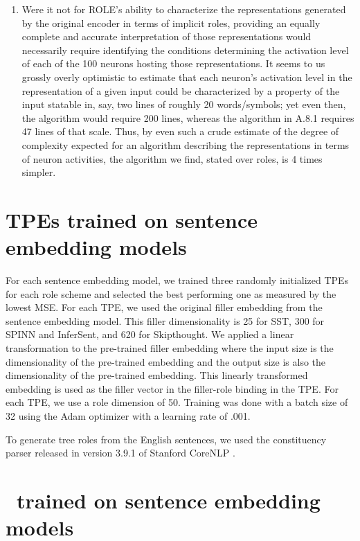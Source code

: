 \begin{enumerate}
\item
Were it not for ROLE’s ability to characterize the representations generated by the original encoder in terms of implicit roles, providing an equally complete and accurate interpretation of those representations would necessarily require identifying the conditions determining the activation level of each of the 100 neurons hosting those representations. It seems to us grossly overly optimistic to estimate that each neuron’s activation level in the representation of a given input could be characterized by a property of the input statable in, say, two lines of roughly 20 words/symbols; yet even then, the algorithm would require 200 lines, whereas the algorithm in A.8.1 requires 47 lines of that scale. Thus, by even such a crude estimate of the degree of complexity expected for an algorithm describing the representations in terms of neuron activities, the algorithm we find, stated over roles, is 4 times simpler.


\end{enumerate}

\section{TPEs trained on sentence embedding models} \label{sec:rldn-tpe-sentences}

For each sentence embedding model, we trained three randomly initialized TPEs for each role scheme and selected the best performing one as measured by the lowest MSE. For each TPE, we used the original filler embedding from the sentence embedding model. This filler dimensionality is 25 for SST, 300 for SPINN and InferSent, and 620 for Skipthought. We applied a linear transformation to the pre-trained filler embedding where the input size is the dimensionality of the pre-trained embedding and the output size is also the dimensionality of the pre-trained embedding. This linearly transformed embedding is used as the filler vector in the filler-role binding in the TPE. For each TPE, we use a role dimension of 50. Training was done with a batch size of 32 using the Adam optimizer with a learning rate of .001.

To generate tree roles from the English sentences, we used the constituency parser released in version 3.9.1 of Stanford CoreNLP \citep{klein2003accurate}.

\section{\RLN\ trained on sentence embedding models} \label{sec:rldn-role-sentences}


